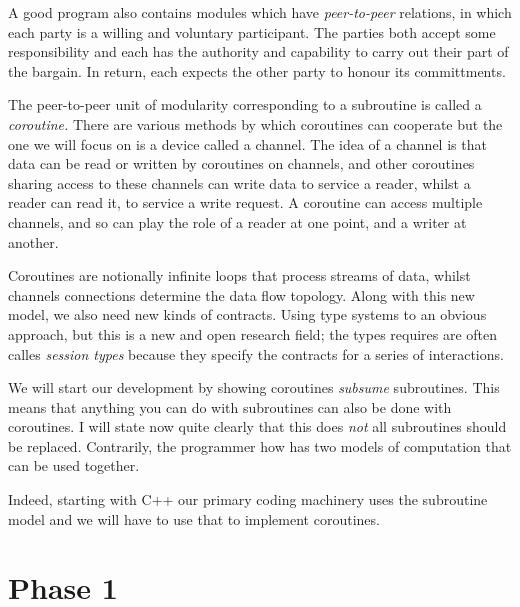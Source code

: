 \documentclass[oneside]{book}
\begin{document}
A good program also contains modules which have {\em peer-to-peer}
relations, in which each party is a willing and voluntary
participant. The parties both accept some responsibility and each
has the authority and capability to carry out their part of the
bargain. In return, each expects the other party to honour its
committments.

The peer-to-peer unit of modularity corresponding to a subroutine
is called a {\em coroutine.} There are various methods by which
coroutines can cooperate but the one we will focus on is a device
called a channel. The idea of a channel is that data can be read or
written by coroutines on channels, and other coroutines sharing
access to these channels can write data to service a reader,
whilst a reader can read it, to service a write request.
A coroutine can access multiple channels, and so can play the role
of a reader at one point, and a writer at another.

Coroutines are notionally infinite loops that process streams
of data, whilst channels connections determine the data flow
topology. Along with this new model, we also need new kinds of contracts.
Using type systems to an obvious approach, but this is a new and
open research field; the types requires are often calles
{\em session types} because they specify the contracts for
a series of interactions.

We will start our development by showing coroutines {\em subsume}
subroutines. This means that anything you can do with subroutines
can also be done with coroutines. I will state now quite clearly
that this does {\em not} all subroutines should be replaced.
Contrarily, the programmer how has two models of computation that
can be used together.

Indeed, starting with C++ our primary coding machinery uses the
subroutine model and we will have to use that to implement 
coroutines.

\chapter{Phase 1}
\end{document}
